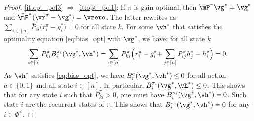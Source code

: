 \begin{proof}
    \ref{it:opt_pol3} $\Rightarrow$ \ref{it:opt_pol1}: If $\pi$ is gain optimal, then $\mP^\pi \vg^*=\vg^*$ and $\bar{\mP}^\pi(\vr^\pi-\vg^*)=\vzero$.
    The latter rewrites as $\sum_{i\in[n]}\bar{P}^\pi_{ki}\Big(r^{\pi}_i-g^*_i\Big) =0$ for all state $k$. For some $\vh^*$ that satisfies the optimality equation \eqref{eq:bias_opt} with $\vg^*$, we have: for all state $k$
    \begin{align*}
        \sum_{i\in[n]}\bar{P}^\pi_{ki}B^{\pi_i}_i(\vg^*,\vh^*) = \sum_{i\in[n]}\bar{P}^\pi_{ki}\Big(r^{\pi}_i-g^*_i {+}\sum_{j\in[n]}P^{\pi}_{ij}h^*_j -h^*_i\Big) =0.
    \end{align*}
    As $\vh^*$ satisfies \eqref{eq:bias_opt}, we have $B^{a}_i(\vg^*,\vh^*) \le0$  for all action $a\in\{0,1\}$ and all state $i\in[n]$.
    In particular, $B^{\pi_i}_i(\vg^*,\vh^*) \le0$.
    This shows that for any state $i$ such that $\bar{P}^\pi_{ki}>0$, one must have $B^{\pi_i}_i(\vg^*,\vh^*) =0$.
    Such state $i$ are the recurrent states of $\pi$.
    This shows that $B^{\pi_i}_i(\vg^*,\vh^*) =0$ for any $i\in\Phi^\pi$.
\end{proof}

